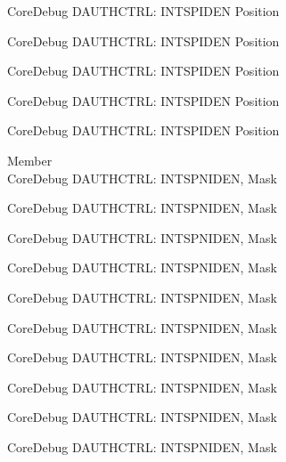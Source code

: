 \begin{DoxyRefList}
\label{deprecated__deprecated000941}%
%
Core\+Debug DAUTHCTRL\+: INTSPIDEN Position 

\label{deprecated__deprecated001020}%
%
Core\+Debug DAUTHCTRL\+: INTSPIDEN Position 

\label{deprecated__deprecated001096}%
%
Core\+Debug DAUTHCTRL\+: INTSPIDEN Position 

\label{deprecated__deprecated001199}%
%
Core\+Debug DAUTHCTRL\+: INTSPIDEN Position 

\label{deprecated__deprecated001301}%
%
Core\+Debug DAUTHCTRL\+: INTSPIDEN Position  
\item[Member \doxylink{group___c_m_s_i_s___s_c_b_gadad0bf68d32cba49c1ea7534122c2752}{Core\+Debug\+\_\+\+DAUTHCTRL\+\_\+\+INTSPNIDEN\+\_\+\+Msk} ]\hfill \\
\label{deprecated__deprecated000086}%
%
Core\+Debug DAUTHCTRL\+: INTSPNIDEN, Mask 

\label{deprecated__deprecated000140}%
%
Core\+Debug DAUTHCTRL\+: INTSPNIDEN, Mask 

\label{deprecated__deprecated000216}%
%
Core\+Debug DAUTHCTRL\+: INTSPNIDEN, Mask 

\label{deprecated__deprecated000279}%
%
Core\+Debug DAUTHCTRL\+: INTSPNIDEN, Mask 

\label{deprecated__deprecated000358}%
%
Core\+Debug DAUTHCTRL\+: INTSPNIDEN, Mask 

\label{deprecated__deprecated000434}%
%
Core\+Debug DAUTHCTRL\+: INTSPNIDEN, Mask 

\label{deprecated__deprecated000537}%
%
Core\+Debug DAUTHCTRL\+: INTSPNIDEN, Mask 

\label{deprecated__deprecated000639}%
%
Core\+Debug DAUTHCTRL\+: INTSPNIDEN, Mask 

\label{deprecated__deprecated000745}%
%
Core\+Debug DAUTHCTRL\+: INTSPNIDEN, Mask 

\label{deprecated__deprecated000799}%
%
Core\+Debug DAUTHCTRL\+: INTSPNIDEN, Mask 


\end{DoxyRefList}
